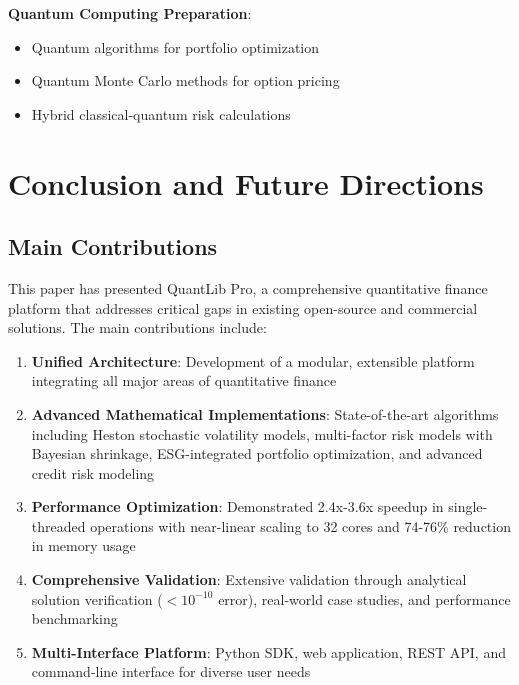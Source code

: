 \documentclass[12pt,a4paper]{article}
\theoremstyle{definition}
\theoremstyle{remark}
\begin{document}
\textbf{Quantum Computing Preparation}:
\begin{itemize}
    \item Quantum algorithms for portfolio optimization
    \item Quantum Monte Carlo methods for option pricing
    \item Hybrid classical-quantum risk calculations
\end{itemize}

\section{Conclusion and Future Directions}

\subsection{Main Contributions}

This paper has presented QuantLib Pro, a comprehensive quantitative finance platform that addresses critical gaps in existing open-source and commercial solutions. The main contributions include:

\begin{enumerate}
    \item \textbf{Unified Architecture}: Development of a modular, extensible platform integrating all major areas of quantitative finance
    
    \item \textbf{Advanced Mathematical Implementations}: State-of-the-art algorithms including Heston stochastic volatility models, multi-factor risk models with Bayesian shrinkage, ESG-integrated portfolio optimization, and advanced credit risk modeling
    
    \item \textbf{Performance Optimization}: Demonstrated 2.4x-3.6x speedup in single-threaded operations with near-linear scaling to 32 cores and 74-76\% reduction in memory usage
    
    \item \textbf{Comprehensive Validation}: Extensive validation through analytical solution verification ($<10^{-10}$ error), real-world case studies, and performance benchmarking
    
    \item \textbf{Multi-Interface Platform}: Python SDK, web application, REST API, and command-line interface for diverse user needs
\end{enumerate}
\end{document}
